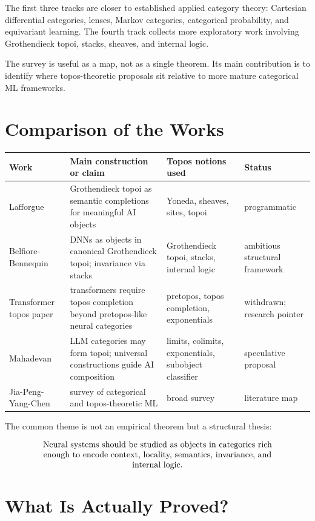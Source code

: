 \documentclass[11pt]{article}
\begin{document}
The first three tracks are closer to established applied category theory: Cartesian differential categories, lenses, Markov categories, categorical probability, and equivariant learning. The fourth track collects more exploratory work involving Grothendieck topoi, stacks, sheaves, and internal logic.


The survey is useful as a map, not as a single theorem. Its main contribution is to identify where topos-theoretic proposals sit relative to more mature categorical ML frameworks.


\section{Comparison of the Works}

\begin{longtable}{>{\raggedright\arraybackslash}p{}>{\raggedright\arraybackslash}p{}>{\raggedright\arraybackslash}p{}>{\raggedright\arraybackslash}p{}}
\toprule
Work & Main construction or claim & Topos notions used & Status \\
\midrule
\endhead
Lafforgue & Grothendieck topoi as semantic completions for meaningful AI objects & Yoneda, sheaves, sites, topoi & programmatic \\
Belfiore-Bennequin & DNNs as objects in canonical Grothendieck topoi; invariance via stacks & Grothendieck topoi, stacks, internal logic & ambitious structural framework \\
Transformer topos paper & transformers require topos completion beyond pretopos-like neural categories & pretopos, topos completion, exponentials & withdrawn; research pointer \\
Mahadevan & LLM categories may form topoi; universal constructions guide AI composition & limits, colimits, exponentials, subobject classifier & speculative proposal \\
Jia-Peng-Yang-Chen & survey of categorical and topos-theoretic ML & broad survey & literature map \\
\bottomrule
\end{longtable}

The common theme is not an empirical theorem but a structural thesis:


\[
\parbox{0.86\textwidth}{\centering
Neural systems should be studied as objects in categories rich enough to
encode context, locality, semantics, invariance, and internal logic.}
\]

\section{What Is Actually Proved?}
\end{document}

